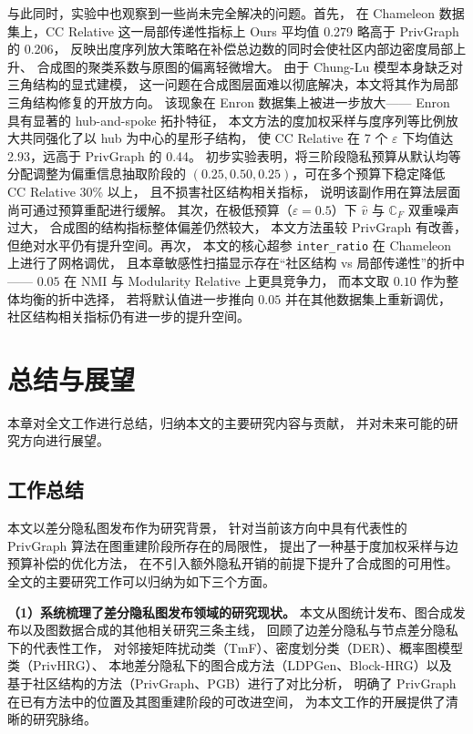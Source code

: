 \par 与此同时，实验中也观察到一些尚未完全解决的问题。首先，
在 Chameleon 数据集上，CC Relative 这一局部传递性指标上 Ours 平均值 0.279
略高于 PrivGraph 的 0.206，
反映出度序列放大策略在补偿总边数的同时会使社区内部边密度局部上升、
合成图的聚类系数与原图的偏离轻微增大。
由于 Chung-Lu 模型本身缺乏对三角结构的显式建模，
这一问题在合成图层面难以彻底解决，本文将其作为局部三角结构修复的开放方向。
该现象在 Enron 数据集上被进一步放大——
Enron 具有显著的 hub-and-spoke 拓扑特征，
本文方法的度加权采样与度序列等比例放大共同强化了以 hub 为中心的星形子结构，
使 CC Relative 在 7 个 $\varepsilon$ 下均值达 2.93，远高于 PrivGraph 的 0.44。
初步实验表明，将三阶段隐私预算从默认均等分配调整为偏重信息抽取阶段的
$(0.25, 0.50, 0.25)$，可在多个预算下稳定降低 CC Relative 30\% 以上，
且不损害社区结构相关指标，
说明该副作用在算法层面尚可通过预算重配进行缓解。
其次，在极低预算（$\varepsilon = 0.5$）下 $\hat{v}$ 与 $\mathbb{C}_F$ 双重噪声过大，
合成图的结构指标整体偏差仍然较大，
本文方法虽较 PrivGraph 有改善，但绝对水平仍有提升空间。再次，
本文的核心超参 \texttt{inter\_ratio} 在 Chameleon 上进行了网格调优，
且本章敏感性扫描显示存在``社区结构 vs 局部传递性''的折中——
$0.05$ 在 NMI 与 Modularity Relative 上更具竞争力，
而本文取 $0.10$ 作为整体均衡的折中选择，
若将默认值进一步推向 $0.05$ 并在其他数据集上重新调优，
社区结构相关指标仍有进一步的提升空间。

\clearpage

\section{总结与展望}

\par 本章对全文工作进行总结，归纳本文的主要研究内容与贡献，
并对未来可能的研究方向进行展望。

\subsection{工作总结}

\par 本文以差分隐私图发布作为研究背景，
针对当前该方向中具有代表性的 PrivGraph 算法在图重建阶段所存在的局限性，
提出了一种基于度加权采样与边预算补偿的优化方法，
在不引入额外隐私开销的前提下提升了合成图的可用性。
全文的主要研究工作可以归纳为如下三个方面。

\par \textbf{（1）系统梳理了差分隐私图发布领域的研究现状。}
本文从图统计发布、图合成发布以及图数据合成的其他相关研究三条主线，
回顾了边差分隐私与节点差分隐私下的代表性工作，
对邻接矩阵扰动类（TmF）、密度划分类（DER）、概率图模型类（PrivHRG）、
本地差分隐私下的图合成方法（LDPGen、Block-HRG）以及
基于社区结构的方法（PrivGraph、PGB）进行了对比分析，
明确了 PrivGraph 在已有方法中的位置及其图重建阶段的可改进空间，
为本文工作的开展提供了清晰的研究脉络。

